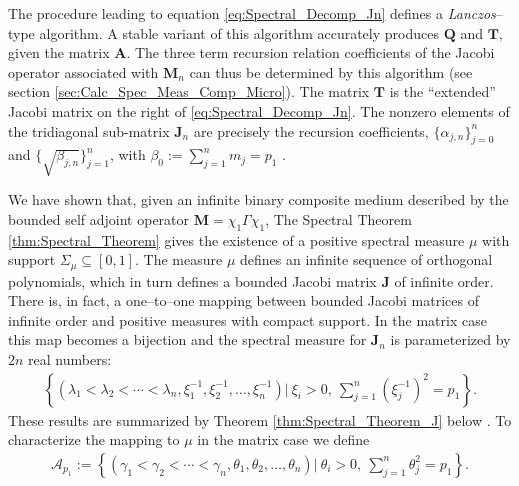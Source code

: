 \documentclass[english,12pt]{ttuthes}
\begin{document}
The procedure leading to equation \eqref{eq:Spectral_Decomp_Jn} 
defines a \emph{Lanczos}--type algorithm. A stable variant of this
algorithm \cite{Gautschi:2004:OP} accurately produces $\mathbf{Q}$ and 
$\mathbf{T}$, given the matrix $\mathbf{A}$. The three term recursion
relation coefficients of the Jacobi operator associated with
$\mathbf{M}_n$ can thus be determined by this algorithm (see section
\ref{sec:Calc_Spec_Meas_Comp_Micro}). The matrix $\mathbf{T}$ is the
``extended'' Jacobi matrix on the right of
\eqref{eq:Spectral_Decomp_Jn}. The nonzero elements of the tridiagonal
sub-matrix $\mathbf{J}_n$ are precisely the recursion coefficients,
$\{\alpha_{j,n}\}_{j=0}^n$ and $\{\sqrt{\beta_{j,n}}\}_{j=1}^n$, with
$\beta_0:=\sum_{j=1}^nm_j=p_1$ \cite{Gautschi:2004:OP}.

We have shown that, given an infinite binary composite medium
described by the bounded self adjoint operator $\mathbf{M}=\chi_1\Gamma\chi_1$,
The Spectral Theorem \ref{thm:Spectral_Theorem} 
gives the existence of a positive spectral measure $\mu$ with support
$\Sigma_\mu\subseteq[0,1]$. The measure $\mu$ defines an infinite sequence of
orthogonal polynomials, which in turn defines a bounded Jacobi matrix
$\mathbf{J}$ of infinite order. There is, in fact, a one--to--one
mapping between bounded Jacobi matrices of infinite order and positive
measures with compact support. In the matrix case this map becomes a
bijection and the spectral measure for $\mathbf{J}_n$ is parameterized
by $2n$ real numbers:  
%
\begin{align}
  \left\{(\lambda_1<\lambda_2<\cdots<\lambda_n,\xi_1^{-1},\xi_2^{-1},\ldots,\xi_n^{-1})
      | \ \xi_i>0, \ \sum_{j=1}^n\left(\xi_j^{-1}\right)^2=p_1\right\}.
\end{align}
%
These results are summarized by Theorem \ref{thm:Spectral_Theorem_J}
below \cite{Deift:2000:RMT}. To characterize the mapping to $\mu$ in the
matrix case we define 
%
\begin{align}\label{eq:mu_Characterization}
  \mathscr{A}_{p_1}:=\left\{(\gamma_1<\gamma_2<\cdots<\gamma_n,\theta_1,\theta_2,\ldots,\theta_n)| \ \theta_i>0, \ \sum_{j=1}^n\theta_j^2=p_1\right\}.
\end{align}
%
%
\end{document}

